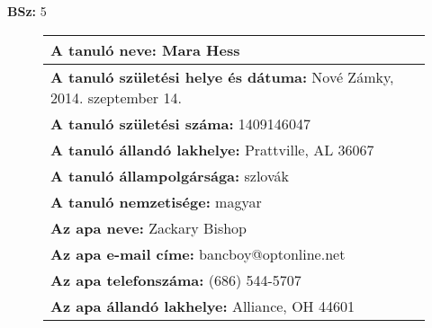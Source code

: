 \documentclass[10pt,a4paper]{article}
\begin{document}
    \vfill
    \textbf{BSz: }5
\newpage
    \begin{figure}[!ht]
    \begin{tabular}{|m{\textwidth}|}
    \hline \vspace{3pt}
    \textbf{A tanuló neve:} \hspace{0.5cm} Mara Hess \vspace{3pt} \\
\hline\vspace{3pt}
\textbf{A tanuló születési helye és dátuma:} \hspace{0.5cm} Nové Zámky, 2014. szeptember 14. \vspace{3pt} \\
\hline\vspace{3pt}
\textbf{A tanuló születési száma:} \hspace{0.5cm} 1409146047 \vspace{3pt} \\
\hline\vspace{3pt}
\textbf{A tanuló állandó lakhelye:} \hspace{0.5cm} Prattville, AL 36067 \vspace{3pt} \\
\hline\vspace{3pt}
\textbf{A tanuló állampolgársága:} \hspace{0.5cm} szlovák \vspace{3pt} \\
\hline\vspace{3pt}
\textbf{A tanuló nemzetisége:} \hspace{0.5cm} magyar \vspace{3pt} \\
\hline\vspace{3pt}
\textbf{Az apa neve:} \hspace{0.5cm} Zackary Bishop \vspace{3pt} \\
\hline\vspace{3pt}
\textbf{Az apa e-mail címe:} \hspace{0.5cm} bancboy@optonline.net \vspace{3pt} \\
\hline\vspace{3pt}
\textbf{Az apa telefonszáma:} \hspace{0.5cm} (686) 544-5707 \vspace{3pt} \\
\hline\vspace{3pt}
\textbf{Az apa állandó lakhelye:} \hspace{0.5cm} Alliance, OH 44601 \vspace{3pt} \\

\end{tabular}
\end{figure}
\end{document}
